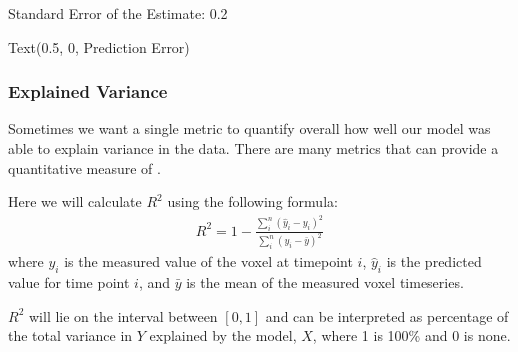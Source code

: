 \documentclass[letterpaper,10pt,english]{sphinxmanual}
\begin{document}
\begin{sphinxVerbatim}[commandchars=\\\{\}]
Standard Error of the Estimate: 0.2
\end{sphinxVerbatim}

\begin{sphinxVerbatim}[commandchars=\\\{\}]
Text(0.5, 0, \PYGZsq{}Prediction Error\PYGZsq{})
\end{sphinxVerbatim}

\noindent{}


\subsubsection{Explained Variance}
\label{\detokenize{content/GLM:explained-variance}}
Sometimes we want a single metric to quantify overall how well our model was able to explain variance in the data. There are many metrics that can provide a quantitative measure of .

Here we will calculate \(R^2\) using the following formula:
\begin{equation*}
\begin{split}R^2 = 1 - \frac{\displaystyle \sum_i^n(\hat y_i - y_i)^2}{\displaystyle \sum_i^n(y_i - \bar y)^2}\end{split}
\end{equation*}
where \(y_i\) is the measured value of the voxel at timepoint \(i\), \(\hat y_i\) is the predicted value for time point \(i\), and \(\bar y\) is the mean of the measured voxel timeseries.

\(R^2\) will lie on the interval between \([0,1]\) and can be interpreted as percentage of the total variance in \(Y\) explained by the model, \(X\), where 1 is 100\% and 0 is none.

\begin{sphinxVerbatim}[commandchars=\\\{\}]
  
        
        
     

 
\end{sphinxVerbatim}
\end{document}
